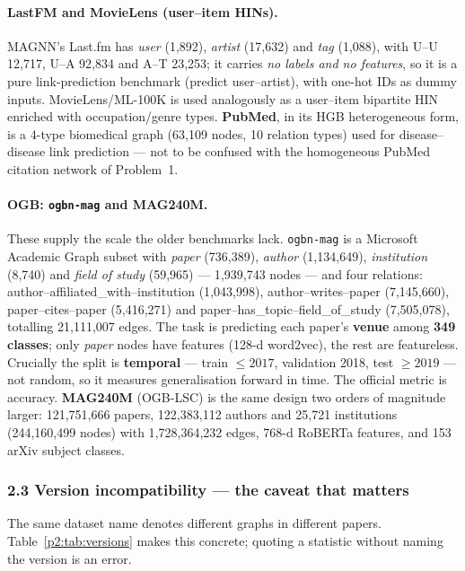 \paragraph{LastFM and MovieLens (user--item HINs).} MAGNN's Last.fm has \emph{user} (1{,}892),
\emph{artist} (17{,}632) and \emph{tag} (1{,}088), with U--U 12{,}717, U--A 92{,}834 and A--T
23{,}253; it carries \emph{no labels and no features}, so it is a pure link-prediction benchmark
(predict user--artist), with one-hot IDs as dummy inputs. MovieLens/ML-100K is used analogously as
a user--item bipartite HIN enriched with occupation/genre types. \textbf{PubMed}, in its HGB
heterogeneous form, is a 4-type biomedical graph (63{,}109 nodes, 10 relation types) used for
disease--disease link prediction --- not to be confused with the homogeneous PubMed citation
network of Problem~1.

\paragraph{OGB: \texttt{ogbn-mag} and MAG240M.} These supply the scale the older benchmarks lack.
\texttt{ogbn-mag} is a Microsoft Academic Graph subset with \emph{paper} (736{,}389),
\emph{author} (1{,}134{,}649), \emph{institution} (8{,}740) and \emph{field of study} (59{,}965)
--- 1{,}939{,}743 nodes --- and four relations: author--affiliated\_with--institution
(1{,}043{,}998), author--writes--paper (7{,}145{,}660), paper--cites--paper (5{,}416{,}271) and
paper--has\_topic--field\_of\_study (7{,}505{,}078), totalling 21{,}111{,}007 edges. The task is
predicting each paper's \textbf{venue} among \textbf{349 classes}; only \emph{paper} nodes have
features (128-d word2vec), the rest are featureless. Crucially the split is \textbf{temporal}
--- train $\le 2017$, validation 2018, test $\ge 2019$ --- not random, so it measures
generalisation forward in time. The official metric is accuracy. \textbf{MAG240M} (OGB-LSC) is the
same design two orders of magnitude larger: 121{,}751{,}666 papers, 122{,}383{,}112 authors and
25{,}721 institutions (244{,}160{,}499 nodes) with 1{,}728{,}364{,}232 edges, 768-d RoBERTa
features, and 153 arXiv subject classes.

\subsubsection*{2.3 Version incompatibility --- the caveat that matters}

The same dataset name denotes different graphs in different papers. Table~\ref{p2:tab:versions}
makes this concrete; quoting a statistic without naming the version is an error.

